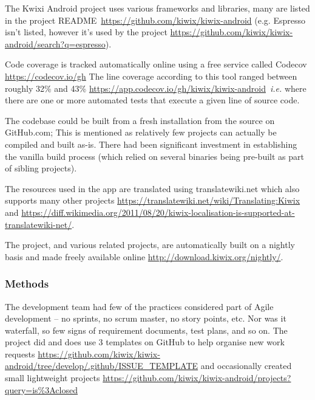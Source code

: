 The Kwixi Android project uses various frameworks and libraries, many are listed in the project README~\url{https://github.com/kiwix/kiwix-android} (e.g. Espresso isn’t listed, however it’s used by the project \url{https://github.com/kiwix/kiwix-android/search?q=espresso}).

Code coverage is tracked automatically online using a free service called Codecov \url{https://codecov.io/gh} The line coverage according to this tool ranged between roughly 32\% and 43\% \url{https://app.codecov.io/gh/kiwix/kiwix-android}~\emph{i.e.} where there are one or more automated tests that execute a given line of source code.  

The codebase could be built from a fresh installation from the source on GitHub.com; This is mentioned as relatively few projects can actually be compiled and built as-is. There had been significant investment in establishing the vanilla build process (which relied on several binaries being pre-built as part of sibling projects).

The resources used in the app are translated using translatewiki.net which also supports many other projects \url{https://translatewiki.net/wiki/Translating:Kiwix} and \url{https://diff.wikimedia.org/2011/08/20/kiwix-localisation-is-supported-at-translatewiki-net/}.

The project, and various related projects, are automatically built on a nightly basis and made freely available online \url{http://download.kiwix.org/nightly/}.

\subsubsection{Methods}

The development team had few of the practices considered part of Agile development – no sprints, no scrum master, no story points, etc. Nor was it waterfall, so few signs of requirement documents, test plans, and so on. The project did and does use 3 templates on GitHub to help organise new work requests \url{https://github.com/kiwix/kiwix-android/tree/develop/.github/ISSUE\_TEMPLATE} and occasionally created small lightweight projects \url{https://github.com/kiwix/kiwix-android/projects?query=is\%3Aclosed} 

